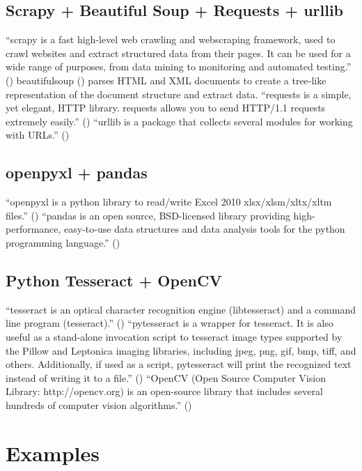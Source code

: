 \documentclass[10pt, letterpaper, twoside]{article}
\begin{document}
\subsection{Scrapy + Beautiful Soup + Requests + urllib}\label{sec:scrapy}
\enquote{\Gls{scrapy} is a fast high-level web crawling and \gls{webscraping} framework, used to crawl websites and extract structured data from their pages. It can be used for a wide range of purposes, from data mining to monitoring and automated testing.} (\cite{scrapy}) \Gls{beautifulsoup} (\cite{beautifulsoup}) parses HTML and XML documents to create a tree-like representation of the document structure and extract data. \enquote{\Gls{requests} is a simple, yet elegant, HTTP library. \Gls{requests} allows you to send HTTP/1.1 requests extremely easily.} (\cite{requests}) \enquote{\gls{urllib} is a package that collects several modules for working with URLs.} (\cite{urllib})
\subsection{openpyxl + pandas}\label{sec:openpyxl_pandas}
\enquote{\gls{openpyxl} is a \Gls{python} library to read/write Excel 2010 xlsx/xlsm/xltx/xltm files.} (\cite{openpyxl})  \enquote{\gls{pandas} is an open source, BSD-licensed library providing high-performance, easy-to-use data structures and data analysis tools for the \Gls{python} programming language.} (\cite{pandas})
\subsection{Python Tesseract + OpenCV}\label{sec:pytesseract_opencv}
\enquote{\Gls{tesseract} is an optical character recognition engine (libtesseract) and a command line program (tesseract).} (\cite{tesseract}) \enquote{\Gls{pytesseract} is a wrapper for \Gls{tesseract}. It is also useful as a stand-alone invocation script to \Gls{tesseract} image types supported by the Pillow and Leptonica imaging libraries, including jpeg, png, gif, bmp, tiff, and others. Additionally, if used as a script, \Gls{pytesseract} will print the recognized text instead of writing it to a file.} (\cite{pytesseract}) \enquote{OpenCV (Open Source Computer Vision Library: http://opencv.org) is an open-source library that includes several hundreds of computer vision algorithms.} (\cite{opencv})
\section{Examples}\label{sec:examples}
\end{document}
